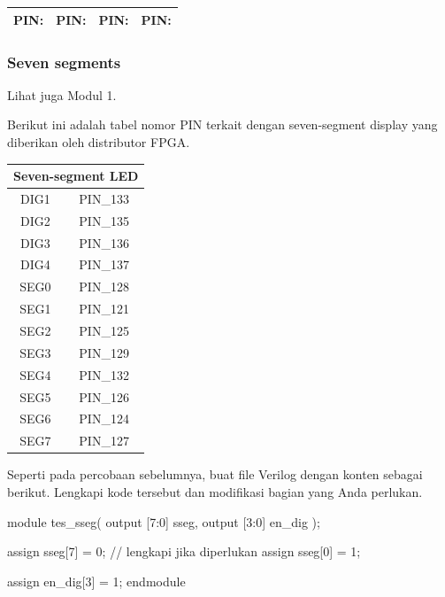 \begin{table}[H]
{\centering
\begin{tabular}{|c|c|c|c|}
\hline
PIN: \hspace{2cm} & PIN: \hspace{2cm} & PIN: \hspace{2cm} & PIN: \hspace{2cm} \\
\hline
\end{tabular}
\par}
\end{table}


\subsubsection{Seven segments}

Lihat juga Modul 1.

Berikut ini adalah tabel nomor PIN terkait dengan seven-segment display
yang diberikan oleh distributor FPGA.

\begin{table}[H]
\centering
\begin{tabular}{|c|c|}
\hline 
\multicolumn{2}{|c|}{Seven-segment LED} \\
\hline 
DIG1 & PIN\_133 \\
\hline 
DIG2 & PIN\_135 \\
\hline 
DIG3 & PIN\_136 \\
\hline 
DIG4 & PIN\_137 \\
\hline 
SEG0 & PIN\_128 \\
\hline 
SEG1 & PIN\_121 \\
\hline 
SEG2 & PIN\_125 \\
\hline
SEG3 & PIN\_129 \\
\hline
SEG4 & PIN\_132 \\
\hline
SEG5 & PIN\_126 \\
\hline
SEG6 & PIN\_124 \\
\hline
SEG7 & PIN\_127 \\
\hline 
\end{tabular}
\par
\end{table}

Seperti pada percobaan sebelumnya, buat file Verilog dengan konten sebagai berikut.
Lengkapi kode tersebut dan modifikasi bagian yang Anda perlukan.

\begin{verilogcode}
module tes_sseg(
  output [7:0] sseg,
  output [3:0] en_dig
);

  assign sseg[7] = 0;
  // lengkapi jika diperlukan
  assign sseg[0] = 1;
  
  assign en_dig[3] = 1;
endmodule
\end{verilogcode}

